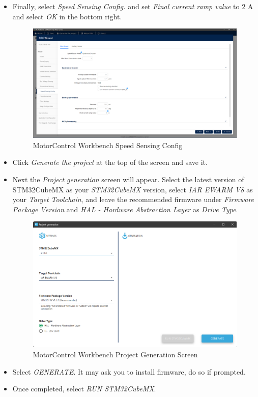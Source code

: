 \documentclass[10pt]{article}
\begin{document}
\begin{itemize}
                \item Finally, select \emph{Speed Sensing Config.} and set \emph{Final current ramp value} to 2 A and select \emph{OK} in the bottom right.
                    \begin{figure}[H]
                        \centerline{\includegraphics[width=\textwidth]{References/MCW FOC QEI Speed Sensing Config.png}}
                        \caption{MotorControl Workbench Speed Sensing Config}
                    \end{figure}
                \item Click \emph{Generate the project} at the top of the screen and save it.
                \item Next the \emph{Project generation} screen will appear. Select the latest version of STM32CubeMX as your \emph{STM32CubeMX} version, select \emph{IAR EWARM V8} as your \emph{Target Toolchain}, and leave the recommended firmware under \emph{Firmware Package Version} and \emph{HAL - Hardware Abstraction Layer} as \emph{Drive Type}.
                    \begin{figure}[H]
                        \centerline{\includegraphics[width=\textwidth]{References/MCW Project Gen.png}}
                        \caption{MotorControl Workbench Project Generation Screen}
                    \end{figure}
                \item Select \emph{GENERATE}. It may ask you to install firmware, do so if prompted.
                \item Once completed, select \emph{RUN STM32CubeMX}.
            \end{itemize}
\end{document}
